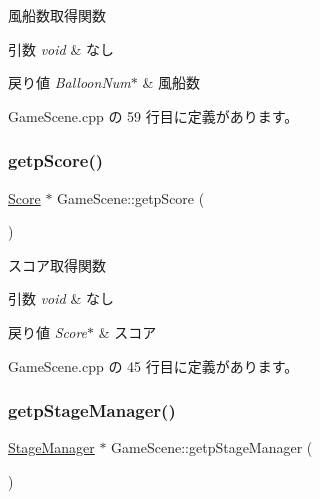 風船数取得関数 


\begin{DoxyParams}{引数}
{\em void} & なし \\
\hline
\end{DoxyParams}

\begin{DoxyRetVals}{戻り値}
{\em Balloon\+Num$\ast$} & 風船数 \\
\hline
\end{DoxyRetVals}


 Game\+Scene.\+cpp の 59 行目に定義があります。

\mbox{\label{class_game_scene_adaeb9248bb4825eb4c80b3b75032fb91}} 
\subsubsection{\texorpdfstring{getp\+Score()}{getpScore()}}
{\footnotesize\ttfamily \mbox{\hyperlink{class_score}{Score}} $\ast$ Game\+Scene\+::getp\+Score (\begin{DoxyParamCaption}{ }\end{DoxyParamCaption})}



スコア取得関数 


\begin{DoxyParams}{引数}
{\em void} & なし \\
\hline
\end{DoxyParams}

\begin{DoxyRetVals}{戻り値}
{\em Score$\ast$} & スコア \\
\hline
\end{DoxyRetVals}


 Game\+Scene.\+cpp の 45 行目に定義があります。

\mbox{\label{class_game_scene_adbeafbb5e7029a875c7471d9792e5862}} 
\subsubsection{\texorpdfstring{getp\+Stage\+Manager()}{getpStageManager()}}
{\footnotesize\ttfamily \mbox{\hyperlink{class_stage_manager}{Stage\+Manager}} $\ast$ Game\+Scene\+::getp\+Stage\+Manager (\begin{DoxyParamCaption}{ }\end{DoxyParamCaption})}



